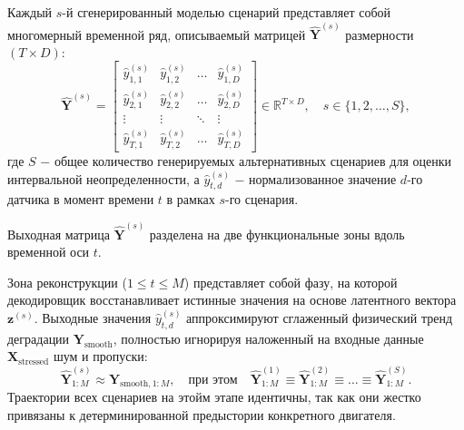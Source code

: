 \documentclass[14pt, a4paper, oneside]{extreport}
\begin{document}

Каждый $s$-й сгенерированный моделью сценарий представляет собой многомерный временной ряд, описываемый матрицей $\hat{\mathbf{Y}}^{(s)}$ размерности $(T \times D)$:
\begin{equation}
\hat{\mathbf{Y}}^{(s)} = \begin{bmatrix} 
\hat{y}_{1,1}^{(s)} & \hat{y}_{1,2}^{(s)} & \dots & \hat{y}_{1,D}^{(s)} \\
\hat{y}_{2,1}^{(s)} & \hat{y}_{2,2}^{(s)} & \dots & \hat{y}_{2,D}^{(s)} \\
\vdots & \vdots & \ddots & \vdots \\
\hat{y}_{T,1}^{(s)} & \hat{y}_{T,2}^{(s)} & \dots & \hat{y}_{T,D}^{(s)}
\end{bmatrix} \in \mathbb{R}^{T \times D}, \quad s \in \{1, 2, \dots, S\},
\end{equation}
где $S$ $-$ общее количество генерируемых альтернативных сценариев для оценки интервальной неопределенности, а $\hat{y}_{t,d}^{(s)}$ $-$ нормализованное значение $d$-го датчика в момент времени $t$ в рамках $s$-го сценария.

Выходная матрица $\hat{\mathbf{Y}}^{(s)}$ разделена на две функциональные зоны вдоль временной оси $t$.

{Зона реконструкции ($1 \le t \le M$)} представляет собой фазу, на которой декодировщик восстанавливает истинные значения на основе латентного вектора $\mathbf{z}^{(s)}$. Выходные значения $\hat{y}_{t,d}^{(s)}$ аппроксимируют сглаженный физический тренд деградации $\mathbf{Y}_{\text{smooth}}$, полностью игнорируя наложенный на входные данные $\mathbf{X}_{\text{stressed}}$ шум и пропуски:
\begin{equation}
\hat{\mathbf{Y}}_{1:M}^{(s)} \approx \mathbf{Y}_{\text{smooth}, 1:M}, \quad \text{при этом} \quad \hat{\mathbf{Y}}_{1:M}^{(1)} \equiv \hat{\mathbf{Y}}_{1:M}^{(2)} \equiv \dots \equiv \hat{\mathbf{Y}}_{1:M}^{(S)}.
\end{equation}
Траектории всех сценариев на этойм этапе идентичны, так как они жестко привязаны к детерминированной предыстории конкретного двигателя.
    
\end{document}
